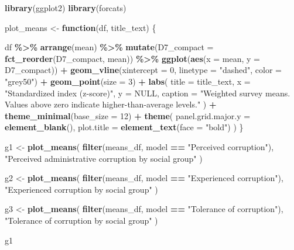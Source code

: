 \documentclass[
]{article}
\newenvironment{Shaded}{\begin{snugshade}}{\end{snugshade}}
\newcommand{\AttributeTok}[1]{\textcolor[rgb]{0.13,0.29,0.53}{#1}}
\newcommand{\ConstantTok}[1]{\textcolor[rgb]{0.56,0.35,0.01}{#1}}
\newcommand{\ControlFlowTok}[1]{\textcolor[rgb]{0.13,0.29,0.53}{\textbf{#1}}}
\newcommand{\DecValTok}[1]{\textcolor[rgb]{0.00,0.00,0.81}{#1}}
\newcommand{\FunctionTok}[1]{\textcolor[rgb]{0.13,0.29,0.53}{\textbf{#1}}}
\newcommand{\NormalTok}[1]{#1}
\newcommand{\OtherTok}[1]{\textcolor[rgb]{0.56,0.35,0.01}{#1}}
\newcommand{\SpecialCharTok}[1]{\textcolor[rgb]{0.81,0.36,0.00}{\textbf{#1}}}
\newcommand{\StringTok}[1]{\textcolor[rgb]{0.31,0.60,0.02}{#1}}
\begin{document}
\begin{Shaded}
\begin{Highlighting}[]
\FunctionTok{library}\NormalTok{(ggplot2)}
\FunctionTok{library}\NormalTok{(forcats)}

\NormalTok{plot\_means }\OtherTok{\textless{}{-}} \ControlFlowTok{function}\NormalTok{(df, title\_text) \{}

\NormalTok{  df }\SpecialCharTok{\%\textgreater{}\%}
    \FunctionTok{arrange}\NormalTok{(mean) }\SpecialCharTok{\%\textgreater{}\%}
    \FunctionTok{mutate}\NormalTok{(}\AttributeTok{D7\_compact =} \FunctionTok{fct\_reorder}\NormalTok{(D7\_compact, mean)) }\SpecialCharTok{\%\textgreater{}\%}
    \FunctionTok{ggplot}\NormalTok{(}\FunctionTok{aes}\NormalTok{(}\AttributeTok{x =}\NormalTok{ mean, }\AttributeTok{y =}\NormalTok{ D7\_compact)) }\SpecialCharTok{+}
    \FunctionTok{geom\_vline}\NormalTok{(}\AttributeTok{xintercept =} \DecValTok{0}\NormalTok{, }\AttributeTok{linetype =} \StringTok{"dashed"}\NormalTok{, }\AttributeTok{color =} \StringTok{"grey50"}\NormalTok{) }\SpecialCharTok{+}
    \FunctionTok{geom\_point}\NormalTok{(}\AttributeTok{size =} \DecValTok{3}\NormalTok{) }\SpecialCharTok{+}
    \FunctionTok{labs}\NormalTok{(}
      \AttributeTok{title =}\NormalTok{ title\_text,}
      \AttributeTok{x =} \StringTok{"Standardized index (z{-}score)"}\NormalTok{,}
      \AttributeTok{y =} \ConstantTok{NULL}\NormalTok{,}
      \AttributeTok{caption =} \StringTok{"Weighted survey means. Values above zero indicate higher{-}than{-}average levels."}
\NormalTok{    ) }\SpecialCharTok{+}
    \FunctionTok{theme\_minimal}\NormalTok{(}\AttributeTok{base\_size =} \DecValTok{12}\NormalTok{) }\SpecialCharTok{+}
    \FunctionTok{theme}\NormalTok{(}
      \AttributeTok{panel.grid.major.y =} \FunctionTok{element\_blank}\NormalTok{(),}
      \AttributeTok{plot.title =} \FunctionTok{element\_text}\NormalTok{(}\AttributeTok{face =} \StringTok{"bold"}\NormalTok{)}
\NormalTok{    )}
\NormalTok{\}}
\end{Highlighting}
\end{Shaded}

\begin{Shaded}
\begin{Highlighting}[]
\NormalTok{g1 }\OtherTok{\textless{}{-}} \FunctionTok{plot\_means}\NormalTok{(}
  \FunctionTok{filter}\NormalTok{(means\_df, model }\SpecialCharTok{==} \StringTok{"Perceived corruption"}\NormalTok{),}
  \StringTok{"Perceived administrative corruption by social group"}
\NormalTok{)}

\NormalTok{g2 }\OtherTok{\textless{}{-}} \FunctionTok{plot\_means}\NormalTok{(}
  \FunctionTok{filter}\NormalTok{(means\_df, model }\SpecialCharTok{==} \StringTok{"Experienced corruption"}\NormalTok{),}
  \StringTok{"Experienced corruption by social group"}
\NormalTok{)}

\NormalTok{g3 }\OtherTok{\textless{}{-}} \FunctionTok{plot\_means}\NormalTok{(}
  \FunctionTok{filter}\NormalTok{(means\_df, model }\SpecialCharTok{==} \StringTok{"Tolerance of corruption"}\NormalTok{),}
  \StringTok{"Tolerance of corruption by social group"}
\NormalTok{)}

\NormalTok{g1}
\end{Highlighting}
\end{Shaded}
\end{document}

